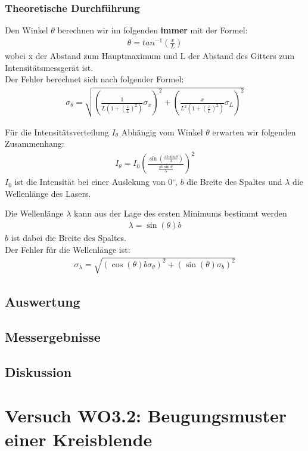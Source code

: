 \documentclass[12pt]{scrartcl}
\begin{document}
\subsubsection{Theoretische Durchführung}
Den Winkel $\theta$ berechnen wir im folgenden \textbf{immer} mit der Formel:
\begin{align}
\theta = tan^{-1}(\frac{x}{L})
\end{align}
wobei x der Abstand zum Hauptmaximum und L der Abstand des Gitters zum Intensitätsmessgerät ist.\\
Der Fehler berechnet sich nach folgender Formel:
\begin{align}
\sigma_\theta = \sqrt{
\left(\frac{1}{L\left(1+\left(\frac{x}{L}\right)^2\right)}\sigma_x\right)^2+
\left(\frac{x}{L^2\left(1+\left(\frac{x}{L}\right)^2\right)}\sigma_L\right)^2}
\end{align}

Für die Intensitätsverteilung $I_\theta$ Abhängig vom Winkel $\theta$ erwarten wir folgenden Zusammenhang:
\begin{align}
I_\theta = I_0 \left(\frac{\sin \left(\frac{\pi b \sin{\theta}}{\lambda}\right)}{\frac{\pi b \sin{\theta}}{\lambda}}\right)^2
\end{align}
$I_0$ ist die Intensität bei einer Auslekung von 0$^{\circ}$, $b$ die Breite des Spaltes und $\lambda$ die Wellenlänge des Lasers.

Die Wellenlänge $\lambda$ kann aus der Lage des ersten Minimums bestimmt werden
\begin{align}
\lambda = \sin(\theta) b
\end{align}
$b$ ist dabei die Breite des Spaltes.\\
Der Fehler für die Wellenlänge ist:
\begin{align}
\sigma_\lambda = \sqrt{
\left(\cos(\theta)b \sigma_\theta\right)^2+
\left(\sin(\theta) \sigma_b\right)^2}
\end{align}
\subsection{Auswertung}
\subsection{Messergebnisse}
\subsection{Diskussion}

\section{Versuch WO3.2: Beugungsmuster einer Kreisblende}
\end{document}
